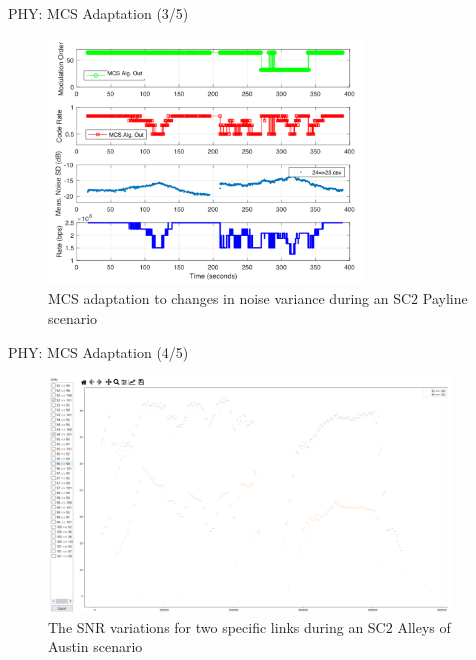 \documentclass{beamer}
\begin{document}
\begin{frame}{PHY: MCS Adaptation (3/5)}
\begin{figure}
    \centering
    \includegraphics[width = 0.75\textwidth]{Payline_MCS_Adaptation.PNG}
    \caption{MCS adaptation to changes in noise variance during an SC$2$ Payline scenario}
    \label{fig:8}
\end{figure}
\end{frame}
\begin{frame}{PHY: MCS Adaptation (4/5)}
\begin{figure}
    \centering
    \includegraphics[width = 0.95\textwidth]{Alleys_MCS_2.PNG}
    \caption{The SNR variations for two specific links during an SC$2$ Alleys of Austin scenario}
    \label{fig:9}
\end{figure}
\end{frame}
\end{document}
